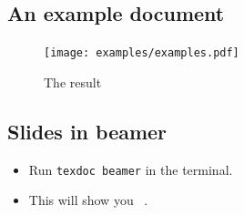 \subsection{An example document}

\begin{frame}
  
\end{frame}

\begin{frame}
  \begin{figure}
    \texttt{[image: examples/examples.pdf]}
    \caption{The result}
  \end{figure}
\end{frame}


\subsection{Slides in beamer}

%	

\begin{frame}
  \begin{remark}
    \begin{itemize}
      \item Run \lstinline{texdoc beamer} in the terminal.
      \item This will show you 
        ~\cite{beameruserguide}.
    \end{itemize}
  \end{remark}
\end{frame}

